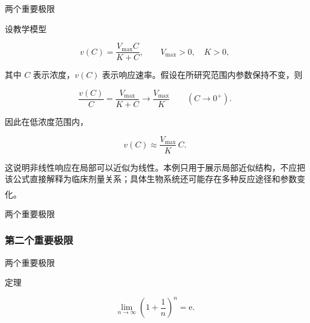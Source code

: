 \documentclass[aspectratio=169,10pt,fontset=fandol]{ctexbeamer}
\newcommand{\ee}{\mathrm{e}}
\newcommand{\upcite}[1]{\textsuperscript{\textsuperscript{\cite{#1}}}}
\begin{document}
\begin{frame}[t,fragile]{两个重要极限}
\normalsize
{\normalsize
\begin{application}

设教学模型

\[

v(C)=\frac{V_{\max}C}{K+C},\qquad V_{\max}>0,\quad K>0,

\]

其中 $C$ 表示浓度，$v(C)$ 表示响应速率。假设在所研究范围内参数保持不变，则

\[

\frac{v(C)}{C}=\frac{V_{\max}}{K+C}

\longrightarrow\frac{V_{\max}}K

\qquad(C\to0^+).

\]

因此在低浓度范围内，

\[

v(C)\approx\frac{V_{\max}}K\,C.

\]

这说明非线性响应在局部可以近似为线性。本例只用于展示局部近似结构，不应把该公式直接解释为临床剂量关系；具体生物系统还可能存在多种反应途径和参数变化。\upcite{NCBIEnzyme}

\end{application}
}
\end{frame}
\begin{frame}[t,fragile]{两个重要极限}
\normalsize
{\normalsize




\subsubsection*{第二个重要极限}






}
\end{frame}
\begin{frame}[t,fragile]{两个重要极限}
\normalsize
\begin{block}{定理}
{\normalsize


	\[

	\lim_{n\to\infty} \left(1 + \dfrac{1}{n}\right)^n = \ee.

	\]


}
\end{block}
\end{frame}
\end{document}
